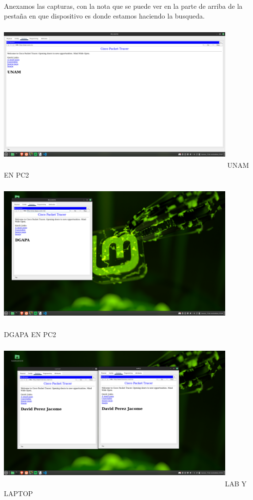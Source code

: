 \documentclass[14pt]{book}
\begin{document}
Anexamos las capturas, con la nota que se puede ver en la parte de arriba de la pestaña en que dispositivo es donde estamos haciendo la busqueda.\\

\includegraphics[width=12cm, height=8cm]{images/pc2-unam.png} UNAM EN PC2\\

\includegraphics[width=12cm, height=8cm]{images/pc2-dgapa.png}DGAPA EN PC2\\

\includegraphics[width=12cm, height=8cm]{images/lap y lab.png}LAB Y LAPTOP\\
\end{document}
